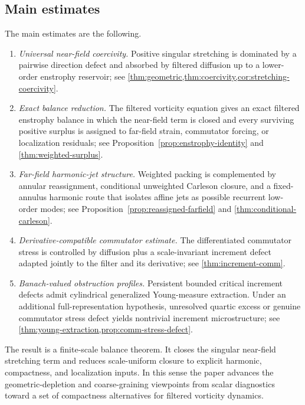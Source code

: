 \documentclass[11pt]{article}
\numberwithin{equation}{section}
\theoremstyle{plain}
\theoremstyle{definition}
\theoremstyle{remark}
\begin{document}
\subsection*{Main estimates}
The main estimates are the following.
\begin{enumerate}[label=\textup{(\roman*)},leftmargin=2.2em]
\item \emph{Universal near-field coercivity.}  Positive singular stretching is dominated by a pairwise direction defect and absorbed by filtered diffusion up to a lower-order enstrophy reservoir; see \cref{thm:geometric,thm:coercivity,cor:stretching-coercivity}.
\item \emph{Exact balance reduction.}  The filtered vorticity equation gives an exact filtered enstrophy balance in which the near-field term is closed and every surviving positive surplus is assigned to far-field strain, commutator forcing, or localization residuals; see Proposition~\ref{prop:enstrophy-identity} and \cref{thm:weighted-surplus}.
\item \emph{Far-field harmonic-jet structure.}  Weighted packing is complemented by annular reassignment, conditional unweighted Carleson closure, and a fixed-annulus harmonic route that isolates affine jets as possible recurrent low-order modes; see Proposition~\ref{prop:reassigned-farfield} and \cref{thm:conditional-carleson}.
\item \emph{Derivative-compatible commutator estimate.}  The differentiated commutator stress is controlled by diffusion plus a scale-invariant increment defect adapted jointly to the filter and its derivative; see \cref{thm:increment-comm}.
\item \emph{Banach-valued obstruction profiles.}  Persistent bounded critical increment defects admit cylindrical generalized Young-measure extraction.  Under an additional full-representation hypothesis, unresolved quartic excess or genuine commutator stress defect yields nontrivial increment microstructure; see \cref{thm:young-extraction,prop:comm-stress-defect}.
\end{enumerate}
The result is a finite-scale balance theorem.  It closes the singular near-field stretching term and reduces scale-uniform closure to explicit harmonic, compactness, and localization inputs.  In this sense the paper advances the geometric-depletion and coarse-graining viewpoints from scalar diagnostics toward a set of compactness alternatives for filtered vorticity dynamics.
\end{document}

